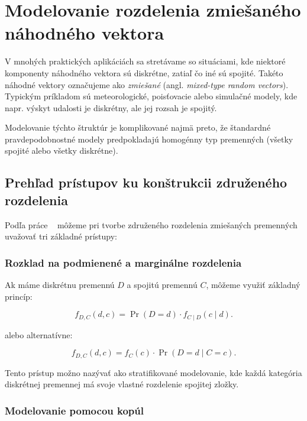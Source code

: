 \section{Modelovanie rozdelenia zmiešaného náhodného vektora}\label{sec:joint_mixture_modeling}

V mnohých praktických aplikáciách sa stretávame so situáciami, kde niektoré komponenty náhodného vektora sú diskrétne, zatiaľ čo iné sú spojité. Takéto náhodné vektory označujeme ako \textit{zmiešané} (angl. \textit{mixed-type random vectors}). Typickým príkladom sú meteorologické, poisťovacie alebo simulačné modely, kde napr. výskyt udalosti je diskrétny, ale jej rozsah je spojitý. 

Modelovanie týchto štruktúr je komplikované najmä preto, že štandardné pravdepodobnostné modely predpokladajú homogénny typ premenných (všetky spojité alebo všetky diskrétne).

\subsection{Prehľad prístupov ku konštrukcii združeného rozdelenia}\label{subsec:overview_joint_mixed}

Podľa práce ~\textcite{pleisMixtureDissertation} môžeme pri tvorbe združeného rozdelenia zmiešaných premenných uvažovať tri základné prístupy:

\subsubsection{Rozklad na podmienené a marginálne rozdelenia}
Ak máme diskrétnu premennú $D$ a spojitú premennú $C$, môžeme využiť základný princíp:

\begin{equation}
f_{D,C}(d, c) = \Pr(D = d) \cdot f_{C \mid D}(c \mid d).
\end{equation}

alebo alternatívne:

\begin{equation}
f_{D,C}(d, c) = f_C(c) \cdot \Pr(D = d \mid C=c).
\end{equation}

Tento prístup možno nazývať ako stratifikované modelovanie, kde každá kategória diskrétnej premennej má svoje vlastné rozdelenie spojitej zložky.


\subsubsection{Modelovanie pomocou kopúl}\label{copula_joint_density}


